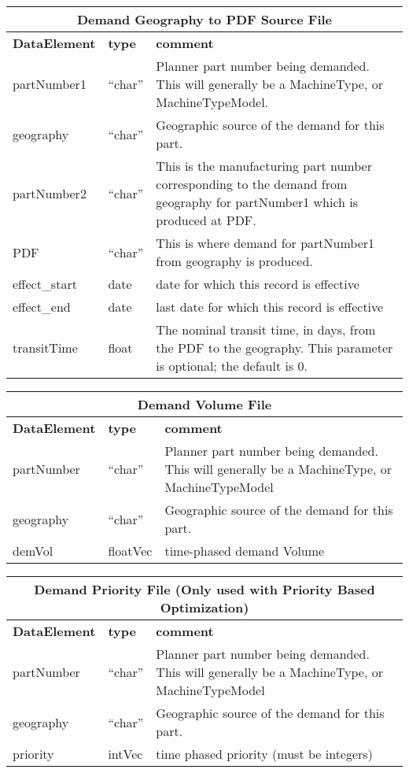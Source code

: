 \begin{tabular}{llp{4in}}
\multicolumn{3}{c}{{\bf Demand Geography to PDF Source File}}\\ \hline\hline
{\bf DataElement} &  {\bf type}  &   {\bf comment} \\ \hline
partNumber1  &    ``char''  &   Planner part number being demanded.  This will generally be a
                           MachineType, or MachineTypeModel. \\
geography   &    ``char'' &    Geographic source of the demand for this part. \\
partNumber2 &  ``char'' &  This is the manufacturing part number corresponding to the 
                           demand from geography for partNumber1 which is produced at PDF. \\
PDF   & ``char''&       This is where demand for partNumber1 from geography is produced. \\
effect\_start   &  date  &    date for which this record is effective  \\
effect\_end     &  date  &    last date for which this record is effective \\
transitTime & float & The nominal transit time, in days, from the PDF to the
       geography.  This parameter is optional; the default is 0. \\
\end{tabular}
 
\vspace{.5in}

\begin{tabular}{llp{4in}}
\multicolumn{3}{c}{{\bf Demand Volume File}}\\ \hline\hline
{\bf DataElement} &  {\bf type}  &   {\bf comment} \\ \hline
partNumber & ``char''  & Planner part number being demanded.  This will generally be a
                       MachineType, or MachineTypeModel \\
geography &  ``char'' &    Geographic source of the demand for this part. \\
demVol    &  floatVec  & time-phased demand Volume \\
\end{tabular}

\vspace{.5in}

\begin{tabular}{llp{4in}}
\multicolumn{3}{c}{{\bf Demand Priority File  (Only used with Priority Based Optimization)}}\\ 
     \hline\hline
{\bf DataElement} &  {\bf type}  &   {\bf comment} \\ \hline
partNumber & ``char'' & Planner part number being demanded.  This will generally be a
                       MachineType, or MachineTypeModel \\
geography  &  ``char'' &    Geographic source of the demand for this part. \\
priority   & intVec   &  time phased priority (must be integers) \\
\end{tabular}

